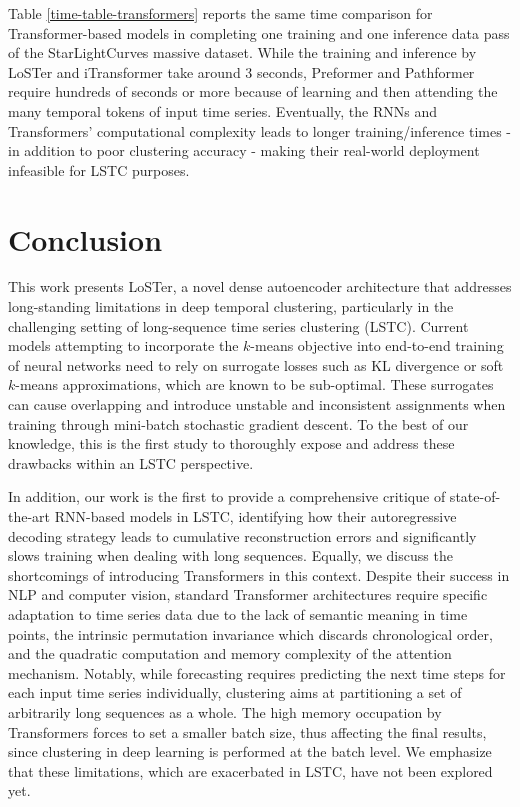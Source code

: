 \documentclass[times, review, 10pt]{elsarticle}
\begin{document}
Table \ref{time-table-transformers} reports the same time comparison for Transformer-based models in completing one training and one inference data pass of the StarLightCurves massive dataset. While the training and inference by LoSTer and iTransformer take around 3 seconds, Preformer and Pathformer require hundreds of seconds or more because of learning and then attending the many temporal tokens of input time series. Eventually, the RNNs and Transformers' computational complexity leads to longer training/inference times - in addition to poor clustering accuracy - making their real-world deployment infeasible for LSTC purposes.

\section{Conclusion}
This work presents LoSTer, a novel dense autoencoder architecture that addresses long-standing limitations in deep temporal clustering, particularly in the challenging setting of long-sequence time series clustering (LSTC). Current models attempting to incorporate the $k$-means objective into end-to-end training of neural networks need to rely on surrogate losses such as KL divergence or soft $k$-means approximations, which are known to be sub-optimal. These surrogates can cause overlapping and introduce unstable and inconsistent assignments when training through mini-batch stochastic gradient descent. To the best of our knowledge, this is the first study to thoroughly expose and address these drawbacks within an LSTC perspective.

In addition, our work is the first to provide a comprehensive critique of state-of-the-art RNN-based models in LSTC, identifying how their autoregressive decoding strategy leads to cumulative reconstruction errors and significantly slows training when dealing with long sequences. Equally, we discuss the shortcomings of introducing Transformers in this context. Despite their success in NLP and computer vision, standard Transformer architectures require specific adaptation to time series data due to the lack of semantic meaning in time points, the intrinsic permutation invariance which discards chronological order, and the quadratic computation and memory complexity of the attention mechanism. Notably, while forecasting requires predicting the next time steps for each input time series individually, clustering aims at partitioning a set of arbitrarily long sequences as a whole. The high memory occupation by Transformers forces to set a smaller batch size, thus affecting the final results, since clustering in deep learning is performed at the batch level. We emphasize that these limitations, which are exacerbated in LSTC, have not been explored yet.
\end{document}
